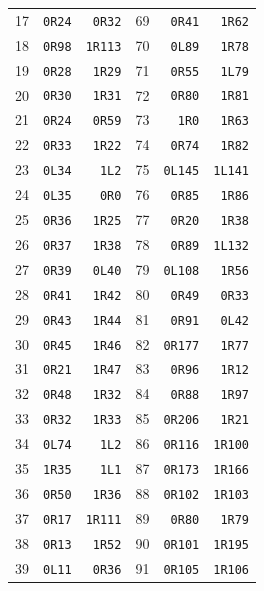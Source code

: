 \begin{center}
\begin{tabular}{rrr@{\hspace{22pt}}rrr}
17 & \texttt{0R24} & \texttt{0R32} & 69 & \texttt{0R41} & \texttt{1R62} \\
18 & \texttt{0R98} & \texttt{1R113} & 70 & \texttt{0L89} & \texttt{1R78} \\
19 & \texttt{0R28} & \texttt{1R29} & 71 & \texttt{0R55} & \texttt{1L79} \\
20 & \texttt{0R30} & \texttt{1R31} & 72 & \texttt{0R80} & \texttt{1R81} \\
21 & \texttt{0R24} & \texttt{0R59} & 73 & \texttt{1R0} & \texttt{1R63} \\
22 & \texttt{0R33} & \texttt{1R22} & 74 & \texttt{0R74} & \texttt{1R82} \\
23 & \texttt{0L34} & \texttt{1L2} & 75 & \texttt{0L145} & \texttt{1L141} \\
24 & \texttt{0L35} & \texttt{0R0} & 76 & \texttt{0R85} & \texttt{1R86} \\
25 & \texttt{0R36} & \texttt{1R25} & 77 & \texttt{0R20} & \texttt{1R38} \\
26 & \texttt{0R37} & \texttt{1R38} & 78 & \texttt{0R89} & \texttt{1L132} \\
27 & \texttt{0R39} & \texttt{0L40} & 79 & \texttt{0L108} & \texttt{1R56} \\
28 & \texttt{0R41} & \texttt{1R42} & 80 & \texttt{0R49} & \texttt{0R33} \\
29 & \texttt{0R43} & \texttt{1R44} & 81 & \texttt{0R91} & \texttt{0L42} \\
30 & \texttt{0R45} & \texttt{1R46} & 82 & \texttt{0R177} & \texttt{1R77} \\
31 & \texttt{0R21} & \texttt{1R47} & 83 & \texttt{0R96} & \texttt{1R12} \\
32 & \texttt{0R48} & \texttt{1R32} & 84 & \texttt{0R88} & \texttt{1R97} \\
33 & \texttt{0R32} & \texttt{1R33} & 85 & \texttt{0R206} & \texttt{1R21} \\
34 & \texttt{0L74} & \texttt{1L2} & 86 & \texttt{0R116} & \texttt{1R100} \\
35 & \texttt{1R35} & \texttt{1L1} & 87 & \texttt{0R173} & \texttt{1R166} \\
36 & \texttt{0R50} & \texttt{1R36} & 88 & \texttt{0R102} & \texttt{1R103} \\
37 & \texttt{0R17} & \texttt{1R111} & 89 & \texttt{0R80} & \texttt{1R79} \\
38 & \texttt{0R13} & \texttt{1R52} & 90 & \texttt{0R101} & \texttt{1R195} \\
39 & \texttt{0L11} & \texttt{0R36} & 91 & \texttt{0R105} & \texttt{1R106} \\

\end{tabular}
\end{center}
